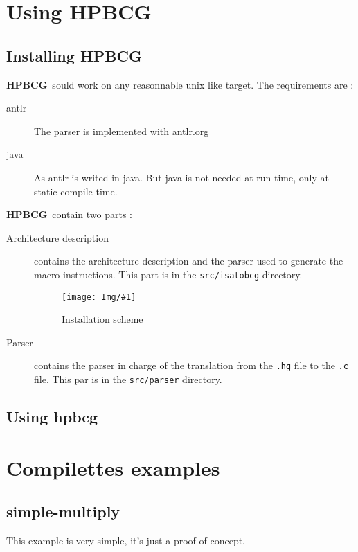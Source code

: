 \documentclass{article}
\newcommand{\hpbcg}{\textbf{HPBCG}\ }
\newcommand{\Fig}[2]{\texttt{[image: Img/\#1]}}
\begin{document}
\section{Using \hpbcg}

\subsection{Installing \hpbcg}

\hpbcg sould work on any reasonnable unix like target. The
requirements are :
\begin{description}
\item[antlr] The parser is implemented with \url{antlr.org}
\item[java] As antlr is writed in java. But java is not needed at
  run-time, only at static compile time.
\end{description}

\hpbcg contain two parts :
\begin{description}
\item[Architecture description] contains the architecture description
  and the parser used to generate the macro instructions. This part is
  in the \texttt{src/isatobcg} directory.

  \begin{figure}
    \centering
    \Fig{IsaToHPBCGChain.pdf}{6}
    \caption{Installation scheme}
    \label{fig:Install}
  \end{figure}
\item[Parser] contains the parser in charge of the translation from
  the \texttt{.hg} file to the \texttt{.c} file. This par is in the
  \texttt{src/parser} directory.
\end{description}


\subsection{Using hpbcg}

\section{Compilettes examples}

\subsection{simple-multiply}

This example is very simple, it's just a proof of concept.
\end{document}
